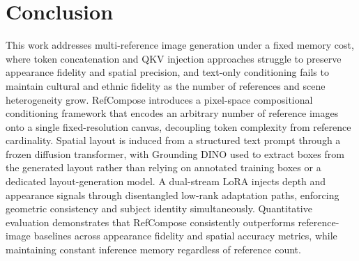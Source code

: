 \section{Conclusion}

This work addresses multi-reference image generation under a fixed memory cost, 
where token concatenation and QKV injection approaches struggle to preserve 
appearance fidelity and spatial precision, and text-only conditioning fails to 
maintain cultural and ethnic fidelity as the number of references and scene 
heterogeneity grow. RefCompose introduces a pixel-space compositional conditioning 
framework that encodes an arbitrary number of reference images onto a single 
fixed-resolution canvas, decoupling token complexity from reference cardinality. 
Spatial layout is induced from a structured text prompt through a frozen diffusion 
transformer, with Grounding DINO used to extract boxes from the generated layout 
rather than relying on annotated training boxes or a dedicated layout-generation 
model. A dual-stream LoRA injects depth and appearance signals through disentangled 
low-rank adaptation paths, enforcing geometric consistency and subject identity 
simultaneously. Quantitative evaluation demonstrates that RefCompose consistently 
outperforms reference-image baselines across appearance fidelity and spatial accuracy 
metrics, while maintaining constant inference memory regardless of reference count.

